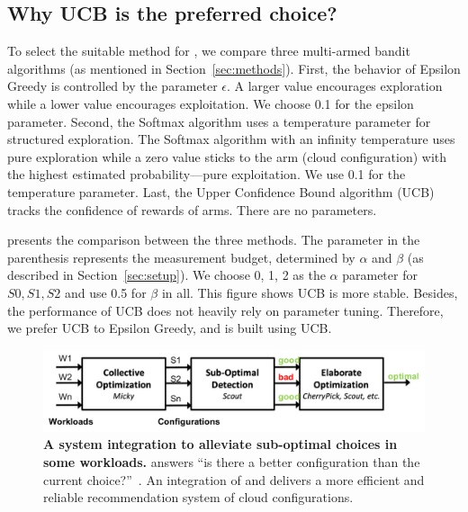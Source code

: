 \subsection{Why UCB is the preferred choice?}
\label{sec:tuning_mab}

To select the suitable method for \micky, we compare three multi-armed bandit algorithms
(as mentioned in Section~\ref{sec:methods}).
First, the behavior of Epsilon Greedy is controlled by the parameter $\epsilon$. A larger value encourages exploration while a lower value encourages exploitation.
We choose 0.1 for the epsilon parameter.
Second, the Softmax algorithm uses a temperature parameter for structured exploration.
The Softmax algorithm with an infinity temperature uses pure exploration while a zero value sticks to the arm (cloud configuration) with the highest estimated probability---pure exploitation.
We use 0.1 for the temperature parameter.
Last, the Upper Confidence Bound algorithm (UCB) tracks the confidence of rewards of arms.
There are no parameters.

\myfigure{\ref{fig:algorithm_selection}} presents the comparison between the three methods.
The parameter in the parenthesis represents the measurement budget, determined by $\alpha$ and $\beta$ (as described in Section~\ref{sec:setup}).
We choose 0, 1, 2 as the $\alpha$ parameter for $S0, S1, S2$ and use 0.5 for $\beta$ in all.
This figure shows UCB is more stable.
Besides, the performance of UCB does not heavily rely on parameter tuning.
Therefore, we prefer UCB to Epsilon Greedy, and \micky is built using UCB.





\begin{figure}[!htbp]
 \includegraphics[width=.8\textwidth]{Figures/system_integration.pdf}
 \centering
 \caption{\textbf{A system integration to alleviate sub-optimal choices in some workloads.} \scout answers ``is there a better configuration than the current choice?''~\cite{Hsu2018Scout}. An integration of \micky and \scout delivers a more efficient and reliable recommendation system of cloud configurations.}
 \label{fig:system_design}
\end{figure}


